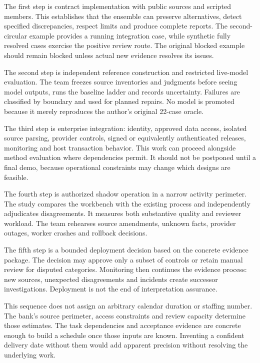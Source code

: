 The first step is contract implementation with public sources and scripted
members. This establishes that the ensemble can preserve alternatives, detect
specified discrepancies, respect limits and produce complete reports. The
second-circular example provides a running integration case, while synthetic
fully resolved cases exercise the positive review route. The original blocked
example should remain blocked unless actual new evidence resolves its issues.

The second step is independent reference construction and restricted live-model
evaluation. The team freezes source inventories and judgments before seeing
model outputs, runs the baseline ladder and records uncertainty. Failures are
classified by boundary and used for planned repairs. No model is promoted because
it merely reproduces the author's original 22-case oracle.

The third step is enterprise integration: identity, approved data access, isolated
source parsing, provider controls, signed or equivalently authenticated releases,
monitoring and host transaction behavior. This work can proceed alongside method
evaluation where dependencies permit. It should not be postponed until a final
demo, because operational constraints may change which designs are feasible.

The fourth step is authorized shadow operation in a narrow activity perimeter.
The study compares the workbench with the existing process and independently
adjudicates disagreements. It measures both substantive quality and reviewer
workload. The team rehearses source amendments, unknown facts, provider outages,
worker crashes and rollback decisions.

The fifth step is a bounded deployment decision based on the concrete evidence
package. The decision may approve only a subset of controls or retain manual
review for disputed categories. Monitoring then continues the evidence process:
new sources, unexpected disagreements and incidents create successor
investigations. Deployment is not the end of interpretation assurance.

This sequence does not assign an arbitrary calendar duration or staffing number.
The bank's source perimeter, access constraints and review capacity determine
those estimates. The task dependencies and acceptance evidence are concrete enough
to build a schedule once those inputs are known. Inventing a confident delivery
date without them would add apparent precision without resolving the underlying
work.

